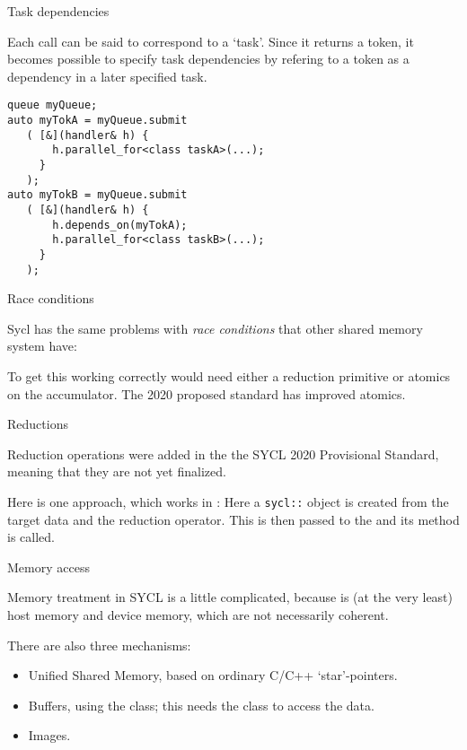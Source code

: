  {Task dependencies}

Each  call can be said to correspond to a `task'.
Since it returns a token, it becomes possible to specify
task dependencies by refering to a token as a dependency
in a later specified task.
\begin{lstlisting}
queue myQueue;
auto myTokA = myQueue.submit
   ( [&](handler& h) {
       h.parallel_for<class taskA>(...);
     }
   );
auto myTokB = myQueue.submit
   ( [&](handler& h) {
       h.depends_on(myTokA);
       h.parallel_for<class taskB>(...);
     }
   );
\end{lstlisting}

 {Race conditions}

Sycl has the same problems with
\emph{race conditions}
that other shared memory system have:


To get this working correctly would need either
a reduction primitive or atomics on the accumulator.
The 2020 proposed standard has improved atomics.


 {Reductions}

Reduction operations were added in the the SYCL 2020 Provisional Standard,
meaning that they are not yet finalized.

Here is one approach, which works in :
%
%
Here a \lstinline+sycl::+ object is created
from the target data and the reduction operator. 
This is then passed to the 
and its  method is called.

 {Memory access}

Memory treatment in SYCL is a little complicated, because is (at the very least)
host memory and device memory, which are not necessarily coherent.

There are also three mechanisms:
\begin{itemize}
\item Unified Shared Memory, based on ordinary C/C++ `star'-pointers.
\item Buffers, using the  class;
  this needs the  class to access the data.
\item Images.
\end{itemize}

